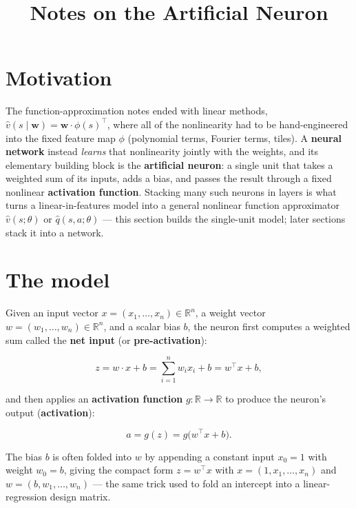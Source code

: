 \documentclass[11pt]{article}
\title{Notes on the Artificial Neuron}
\author{}
\date{}
\begin{document}
\maketitle

\section{Motivation}

The function-approximation notes ended with linear methods,
$\hat v(s\mid\mathbf{w}) = \mathbf{w}\cdot\phi(s)^{\top}$, where all of the
nonlinearity had to be hand-engineered into the fixed feature map $\phi$
(polynomial terms, Fourier terms, tiles). A \textbf{neural network}
instead \emph{learns} that nonlinearity jointly with the weights, and its
elementary building block is the \textbf{artificial neuron}: a single
unit that takes a weighted sum of its inputs, adds a bias, and passes the
result through a fixed nonlinear \textbf{activation function}. Stacking
many such neurons in layers is what turns a linear-in-features model into
a general nonlinear function approximator $\hat v(s;\theta)$ or
$\hat q(s,a;\theta)$ — this section builds the single-unit model; later
sections stack it into a network.

\section{The model}

Given an input vector $x = (x_1, \dots, x_n) \in \mathbb{R}^n$, a weight
vector $w = (w_1, \dots, w_n) \in \mathbb{R}^n$, and a scalar bias $b$, the
neuron first computes a weighted sum called the \textbf{net input} (or
\textbf{pre-activation}):

\[
    z = w \cdot x + b = \sum_{i=1}^{n} w_i x_i + b = w^{\top} x + b,
\]

and then applies an \textbf{activation function} $g: \mathbb{R} \to
\mathbb{R}$ to produce the neuron's output (\textbf{activation}):

\[
    a = g(z) = g\big(w^{\top}x + b\big).
\]

The bias $b$ is often folded into $w$ by appending a constant input
$x_0 = 1$ with weight $w_0 = b$, giving the compact form
$z = w^{\top}x$ with $x = (1, x_1, \dots, x_n)$ and $w = (b, w_1, \dots,
w_n)$ — the same trick used to fold an intercept into a linear-regression
design matrix.
\end{document}
